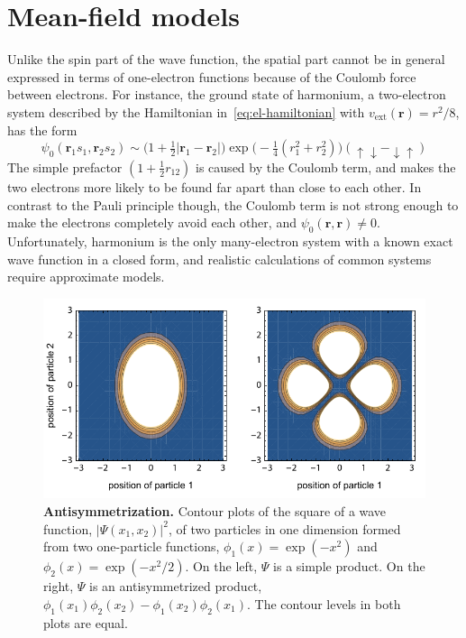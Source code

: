 \section{Mean-field models}

Unlike the spin part of the wave function, the spatial part cannot be in general expressed in terms of one-electron functions because of the Coulomb force between electrons.
For instance, the ground state of harmonium, a two-electron system described by the Hamiltonian in~\eqref{eq:el-hamiltonian} with $v_\text{ext}(\mathbf r)=r^2/8$, has the form
\begin{equation}
  \psi_0(\mathbf r_1s_1,\mathbf r_2s_2)\sim\big(1+\tfrac12|\mathbf r_1-\mathbf r_2|\big)\exp\big(-\tfrac14(r_1^2+r_2^2)\big)(\uparrow\downarrow-\downarrow\uparrow)
\end{equation}
The simple prefactor $(1+\frac12 r_{12})$ is caused by the Coulomb term, and makes the two electrons more likely to be found far apart than close to each other.
In contrast to the Pauli principle though, the Coulomb term is not strong enough to make the electrons completely avoid each other, and $\psi_0(\mathbf r,\mathbf r)\neq0$.
Unfortunately, harmonium is the only many-electron system with a known exact wave function in a closed form, and realistic calculations of common systems require approximate models.

\begin{figure}
\includegraphics[center]{media/exchange.pdf}
\caption{\textbf{Antisymmetrization.}
Contour plots of the square of a wave function, $|\Psi(x_1,x_2)|^2$, of two particles in one dimension formed from two one-particle functions, $\phi_1(x)=\exp(-x^2)$ and $\phi_2(x)=\exp(-x^2/2)$.
On the left, $\Psi$ is a simple product.
On the right, $\Psi$ is an antisymmetrized product, $\phi_1(x_1)\phi_2(x_2)-\phi_1(x_2)\phi_2(x_1)$.
The contour levels in both plots are equal.
}\label{fig:exchange}
\end{figure}

